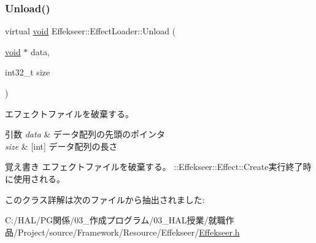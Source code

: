 \subsubsection{\texorpdfstring{Unload()}{Unload()}}
{\footnotesize\ttfamily virtual \mbox{\hyperlink{namespace_effekseer_ab34c4088e512200cf4c2716f168deb56}{void}} Effekseer\+::\+Effect\+Loader\+::\+Unload (\begin{DoxyParamCaption}\item[{\mbox{\hyperlink{namespace_effekseer_ab34c4088e512200cf4c2716f168deb56}{void}} $\ast$}]{data,  }\item[{int32\+\_\+t}]{size }\end{DoxyParamCaption})\hspace{0.3cm}{\ttfamily [pure virtual]}}



エフェクトファイルを破棄する。 


\begin{DoxyParams}{引数}
{\em data} & データ配列の先頭のポインタ \\
\hline
{\em size} & \mbox{[}int\mbox{]} データ配列の長さ \\
\hline
\end{DoxyParams}
\begin{DoxyNote}{覚え書き}
エフェクトファイルを破棄する。 \+::\+Effekseer\+::\+Effect\+::\+Create実行終了時に使用される。 
\end{DoxyNote}


このクラス詳解は次のファイルから抽出されました\+:\begin{DoxyCompactItemize}
\item 
C\+:/\+H\+A\+L/\+P\+G関係/03\+\_\+作成プログラム/03\+\_\+\+H\+A\+L授業/就職作品/\+Project/source/\+Framework/\+Resource/\+Effekseer/\mbox{\hyperlink{_effekseer_8h}{Effekseer.\+h}}\end{DoxyCompactItemize}
